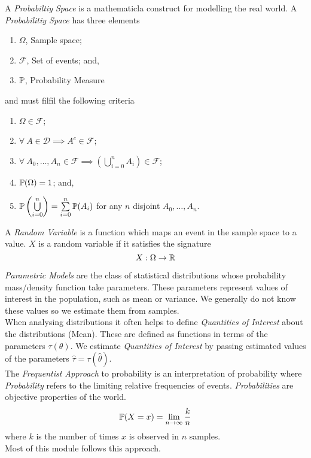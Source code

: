 \documentclass[11pt,a4paper]{article}
\begin{document}
A \textit{Probabiltiy Space} is a mathematicla construct for modelling the real world. A \textit{Probabilitiy Space} has three elements
\begin{enumerate}
	\item $\Omega$, Sample space;
	\item $\mathcal{F}$, Set of events; and,
	\item $\mathbb{P}$, Probability Measure
\end{enumerate}
and must filfil the following criteria
\begin{enumerate}
	\item $\Omega\in\mathcal{F}$;
	\item $\forall\ A\in\mathcal{D}\implies A^c\in\mathcal{F}$;
	\item $\forall\ A_0,\dots,A_n\in\mathcal{F}\implies\left(\bigcup\limits_{i=0}^nA_i\right)\in\mathcal{F}$;
	\item $\mathbb{P}(\Omega)=1$; and,
	\item $\mathbb{P}\left(\bigcup\limits_{i=0}^n\right)=\sum\limits_{i=0}^n\mathbb{P}(A_i)$ for any $n$ disjoint $A_0,\dots,A_n$.
\end{enumerate}

A \textit{Random Variable} is a function which maps an event in the sample space to a value. $X$ is a random variable if it satisfies the signature
$$X:\Omega\to\mathbb{R}$$

\textit{Parametric Models} are the class of statistical distributions whose probability mass/density function take parameters. These parameters represent values of interest in the population, such as mean or variance. We generally do not know these values so we estimate them from samples.\\

When analysing distributions it often helps to define \textit{Quantities of Interest} about the distributions (\eg Mean). These are defined as functions in terms of the parameters $\tau(\theta)$. We estimate \textit{Quantities of Interest} by passing estimated values of the parameters $\hat{\tau}=\tau(\hat{\theta})$.\\

The \textit{Frequentist Approach} to probability is an interpretation of probability where \textit{Probability} refers to the limiting relative frequencies of events. \textit{Probabilities} are objective properties of the world.
$$\mathbb{P}(X=x)=\lim_{n\to\infty}\frac{k}{n}$$
where $k$ is the number of times $x$ is observed in $n$ samples.\\
\nb Most of this module follows this approach.\\
\end{document}
